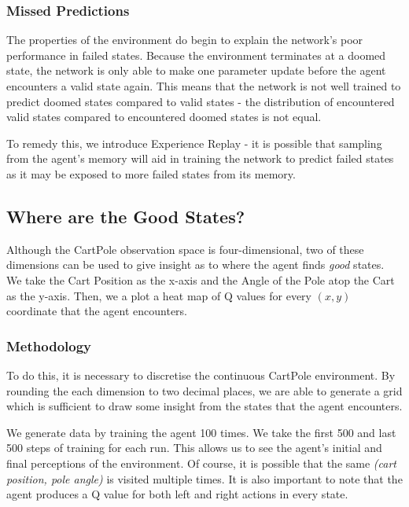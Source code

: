 \documentclass{article}
\begin{document}
\subsubsection{Missed Predictions}

The properties of the environment do begin to explain the network's poor performance in failed states. Because the environment terminates at a doomed state, the network is only able to make one parameter update before the agent encounters a valid state again. This means that the network is not well trained to predict doomed states compared to valid states - the distribution of encountered valid states compared to encountered doomed states is not equal. 

To remedy this, we introduce Experience Replay - it is possible that sampling from the agent's memory will aid in training the network to predict failed states as it may be exposed to more failed states from its memory.


\subsection{Where are the Good States?}

Although the CartPole observation space is four-dimensional, two of these dimensions can be used to give insight as to where the agent finds \textit{good} states. We take the Cart Position as the x-axis and the Angle of the Pole atop the Cart as the y-axis. Then, we a plot a heat map of Q values for every $(x,y)$ coordinate that the agent encounters. 

\subsubsection{Methodology}

To do this, it is necessary to discretise the continuous CartPole environment. By rounding the each dimension to two decimal places, we are able to generate a grid which is sufficient to draw some insight from the states that the agent encounters. 

We generate data by training the agent 100 times. We take the first 500 and last 500 steps of training for each run. This allows us to see the agent's initial and final perceptions of the environment. Of course, it is possible that the same \textit{(cart position, pole angle)} is visited multiple times. It is also important to note that the agent produces a Q value for both left and right actions in every state. 
\end{document}

